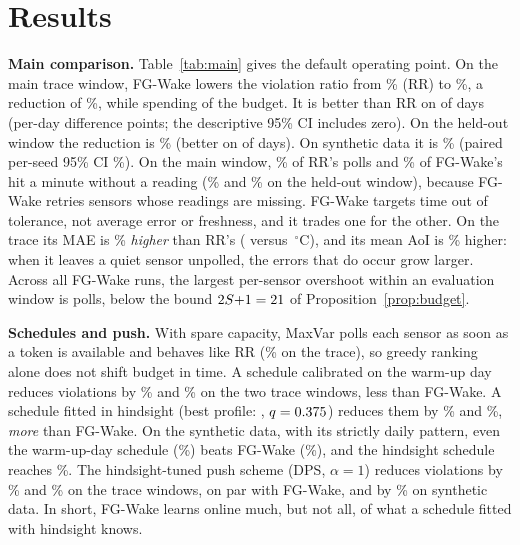 \documentclass[conference]{IEEEtran}
\begin{document}
\section{Results}\label{sec:results}


\textbf{Main comparison.} Table~\ref{tab:main} gives the default operating point.
On the main trace window, FG-Wake lowers the violation ratio from \TrRR\% (RR) to
\TrFG\%, a reduction of \TrRed\%, while spending \TrRateMean{} of the budget. It is
better than RR on \TrDays{} of \TrNdays{} days (per-day difference \TrDiff{}
points; the descriptive 95\% CI \TrDiffCI{} includes zero). On the held-out
window the reduction is
\HoRed\% (better on \HoDays{} of \HoNdays{} days). On synthetic data it is
\SyRed\% (paired per-seed 95\% CI \SyRedCI\%). On the main window, \TrFailRR\% of
RR's polls and \TrFailFG\% of FG-Wake's hit a minute without a reading
(\HoFailRR\% and \HoFailFG\% on the held-out window), because FG-Wake retries
sensors whose readings are missing. FG-Wake targets time out of tolerance, not
average error or freshness, and it trades one for the other. On the trace its MAE
is \TrMaePct\% \emph{higher} than RR's (\TrMaeFG{} versus \TrMaeRR\,$^\circ$C), and its
mean AoI is \TrAoiPct\% higher: when it leaves a quiet sensor unpolled, the
errors that do occur grow larger.
Across all FG-Wake runs, the largest per-sensor overshoot within an evaluation
window is \OverMax{} polls, below the bound $2S{+}1=21$ of
Proposition~\ref{prop:budget}.

\textbf{Schedules and push.} With spare capacity, MaxVar polls each sensor as
soon as a token is available and behaves like RR (\TrMV\% on the trace), so greedy
ranking alone does not shift budget in time. A schedule calibrated on the warm-up
day reduces violations by \TrSchedCRed\% and \HoSchedCRed\% on the two trace
windows, less than FG-Wake. A schedule fitted in hindsight (best profile:
\TrSchedBStat, $q=0.375$) reduces them by \TrSchedBRed\% and
\HoSchedBRed\%, \emph{more} than FG-Wake. On the synthetic data, with its strictly
daily pattern, even the warm-up-day schedule (\SySchedCRed\%) beats FG-Wake
(\SyRed\%), and the hindsight schedule reaches \SySchedBRed\%. The
hindsight-tuned push scheme (DPS, $\alpha=1$) reduces violations by \TrDpsRed\%
and \HoDpsRed\% on the trace windows, on par with FG-Wake, and by \SyDpsRed\% on
synthetic data. In short, FG-Wake learns online much, but not all, of what a
schedule fitted with hindsight knows.
\end{document}
